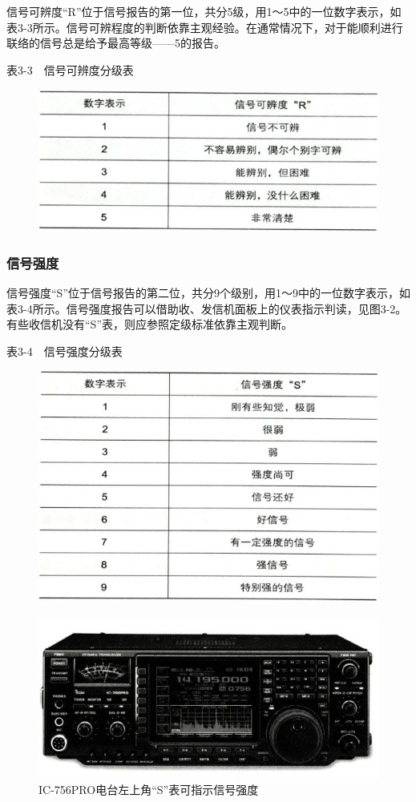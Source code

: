 \documentclass[12pt,UTF8]{ctexbook}
\begin{document}
信号可辨度“R”位于信号报告的第一位，共分5级，用1～5中的一位数字表示，如表3-3所示。信号可辨程度的判断依靠主观经验。在通常情况下，对于能顺利进行联络的信号总是给予最高等级——5的报告。

表3-3　信号可辨度分级表

\begin{figure}[htbp]
	\centering
	\includegraphics[width=0.7\linewidth]{33}
	\caption{}
	\label{fig:1}
\end{figure}

\subsubsection{信号强度}

信号强度“S”位于信号报告的第二位，共分9个级别，用1～9中的一位数字表示，如表3-4所示。信号强度报告可以借助收、发信机面板上的仪表指示判读，见图3-2。有些收信机没有“S”表，则应参照定级标准依靠主观判断。

表3-4　信号强度分级表

\begin{figure}[htbp]
	\centering
	\includegraphics[width=0.7\linewidth]{34}
	\caption{}
	\label{fig:1}
\end{figure}

\begin{figure}[htbp]
	\centering
	\includegraphics[width=0.7\linewidth]{35}
	\caption{IC-756PRO电台左上角“S”表可指示信号强度}
	\label{fig:1}
\end{figure}
\end{document}
